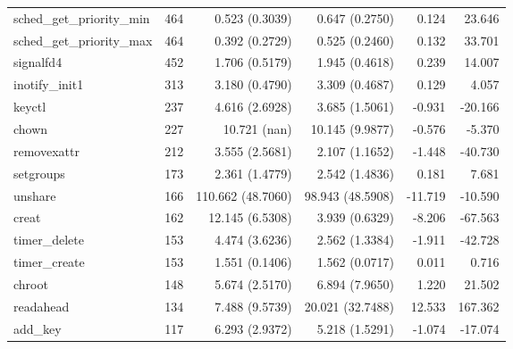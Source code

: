 \begin{longtable}{>{\ttfamily}lrrrrr}
      sched\_get\_priority\_min &         464 &           0.523 (0.3039) &           0.647 (0.2750) &           0.124 &       23.646 \\
      sched\_get\_priority\_max &         464 &           0.392 (0.2729) &           0.525 (0.2460) &           0.132 &       33.701 \\
                      signalfd4 &         452 &           1.706 (0.5179) &           1.945 (0.4618) &           0.239 &       14.007 \\
                 inotify\_init1 &         313 &           3.180 (0.4790) &           3.309 (0.4687) &           0.129 &        4.057 \\
                         keyctl &         237 &           4.616 (2.6928) &           3.685 (1.5061) &          -0.931 &      -20.166 \\
                          chown &         227 &             10.721 (nan) &          10.145 (9.9877) &          -0.576 &       -5.370 \\
                    removexattr &         212 &           3.555 (2.5681) &           2.107 (1.1652) &          -1.448 &      -40.730 \\
                      setgroups &         173 &           2.361 (1.4779) &           2.542 (1.4836) &           0.181 &        7.681 \\
                        unshare &         166 &        110.662 (48.7060) &         98.943 (48.5908) &         -11.719 &      -10.590 \\
                          creat &         162 &          12.145 (6.5308) &           3.939 (0.6329) &          -8.206 &      -67.563 \\
                  timer\_delete &         153 &           4.474 (3.6236) &           2.562 (1.3384) &          -1.911 &      -42.728 \\
                  timer\_create &         153 &           1.551 (0.1406) &           1.562 (0.0717) &           0.011 &        0.716 \\
                         chroot &         148 &           5.674 (2.5170) &           6.894 (7.9650) &           1.220 &       21.502 \\
                      readahead &         134 &           7.488 (9.5739) &         20.021 (32.7488) &          12.533 &      167.362 \\
                       add\_key &         117 &           6.293 (2.9372) &           5.218 (1.5291) &          -1.074 &      -17.074 \\

\end{longtable}

